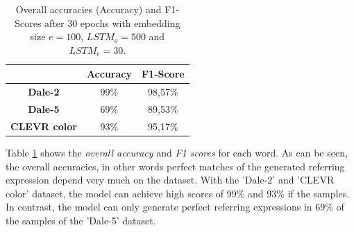 \documentclass[11pt,a4paper]{article}
\begin{document}
\begin{table}[ht]
  \centering
  \begin{tabular}{c|cc}
    \toprule
                         & \textbf{Accuracy} & \textbf{F1-Score} \\\midrule
    \textbf{Dale-2}      & 99\%              & 98,57\%           \\
    \textbf{Dale-5}      & 69\%              & 89,53\%           \\
    \textbf{CLEVR color} & 93\%              & 95,17\%           \\
    \bottomrule
  \end{tabular}
  \caption{Overall accuracies (Accuracy) and F1-Scores after 30 epochs with embedding size $e=100$, $LSTM_o=500$ and $LSTM_e=30$.}
  \label{tab:results:bb-re-generator}
\end{table}

Table \ref{tab:results:bb-re-generator} shows the \emph{overall accuracy} and \emph{F1 scores} for each word.
As can be seen, the overall accuracies, in other words perfect matches of the generated referring expression depend very much on the dataset.
With the 'Dale-2' and 'CLEVR color' dataset, the model can achieve high scores of 99\% and 93\% if the samples.
In contrast, the model can only generate perfect referring expressions in 69\% of the samples of the 'Dale-5' dataset.
\end{document}
